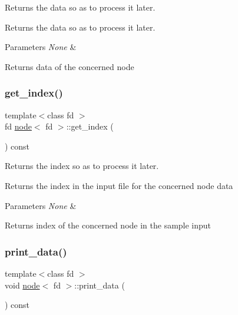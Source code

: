 Returns the data so as to process it later. 

Returns the data so as to process it later.


\begin{DoxyParams}{Parameters}
{\em None} & \\
\hline
\end{DoxyParams}
\begin{DoxyReturn}{Returns}
data of the concerned node 
\end{DoxyReturn}
\mbox{\label{classnode_aa260eb75321b240e0a6a5acdbbfbd43e}} 
\subsubsection{\texorpdfstring{get\+\_\+index()}{get\_index()}}
{\footnotesize\ttfamily template$<$class fd $>$ \\
fd \hyperlink{classnode}{node}$<$ fd $>$\+::get\+\_\+index (\begin{DoxyParamCaption}{ }\end{DoxyParamCaption}) const}



Returns the index so as to process it later. 

Returns the index in the input file for the concerned node data


\begin{DoxyParams}{Parameters}
{\em None} & \\
\hline
\end{DoxyParams}
\begin{DoxyReturn}{Returns}
index of the concerned node in the sample input 
\end{DoxyReturn}
\mbox{\label{classnode_a7985a94a89f71279e7667354481c96f9}} 
\subsubsection{\texorpdfstring{print\+\_\+data()}{print\_data()}}
{\footnotesize\ttfamily template$<$class fd $>$ \\
void \hyperlink{classnode}{node}$<$ fd $>$\+::print\+\_\+data (\begin{DoxyParamCaption}{ }\end{DoxyParamCaption}) const}



